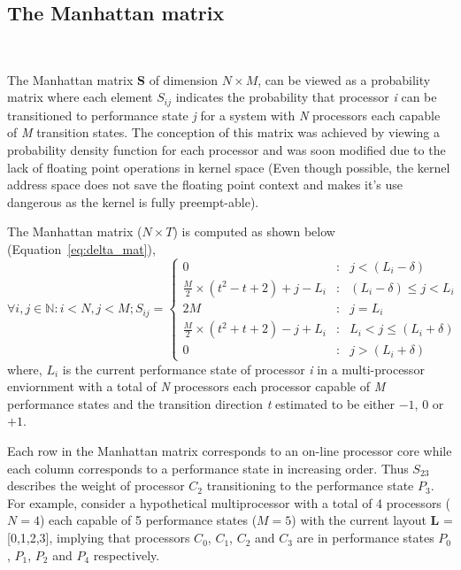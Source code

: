 \subsection{The Manhattan matrix}~\label{sec:delta_matrix}

The Manhattan matrix \textbf{S} of dimension $N \times M$, can be viewed as a probability matrix where each element
$S_{ij}$ indicates the probability that processor \textit{i} can be transitioned to
performance state \textit{j} for a system with \textit{N} processors each 
capable of \textit{M} transition states. The conception of this matrix was achieved by viewing
a probability density function for each processor and was soon modified due to the lack of floating point operations in kernel space 
(Even though possible, the kernel address space does not save the floating point 
context and makes it's use dangerous as the kernel is fully preempt-able).

The Manhattan matrix ($N \times T$) is computed as shown below (Equation~\eqref{eq:delta_mat}),
\begin{equation}
    \forall i,j \in \mathbb{N} : i < N, j < M; S_{ij} = \left\{
     \begin{array}{lcr}
       0 & : & j < (L_{i} - \delta) \\
       \frac{M}{2} \times (t^{2} - t + 2) + j - L_{i} & : & (L_{i} - \delta) \leq j < L_{i} \\
       2M & : & j = L_{i}\\
       \frac{M}{2} \times (t^{2} + t + 2) - j + L_{i} & : & L_{i} < j \leq (L_{i} + \delta) \\
       0 & : & j > (L_{i} + \delta)
     \end{array}
   \right.
\label{eq:delta_mat}
\end{equation}
where, $L_i$ is the current performance state of processor \textit{i} in a multi-processor enviornment 
with a total of \textit{N} processors each processor capable of \textit{M} performance states 
and the transition direction \textit{t} estimated to be either $-1$, $0$ or $+1$. 

Each row in the Manhattan matrix corresponds to an on-line processor core while each column corresponds to a performance state
in increasing order. Thus $S_{23}$ describes the weight of processor $C_2$ transitioning to the performance state $P_3$. 
For example, consider a hypothetical multiprocessor with a total of 4 processors ($N = 4$) each capable of
5 performance states ($M = 5$) with the current layout \textbf{L} = [0,1,2,3], implying that processors $C_0$, $C_1$, $C_2$ and $C_3$
are in performance states $P_0$, $P_1$, $P_2$ and $P_4$ respectively. 

